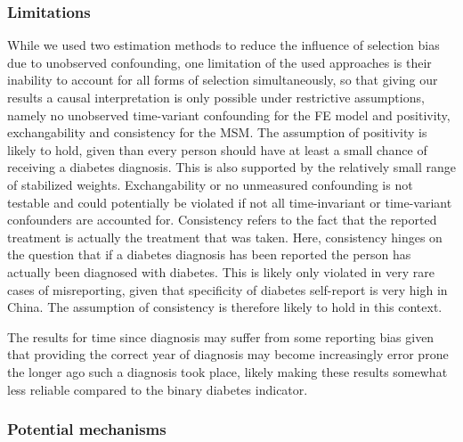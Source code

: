 \subsubsection*{Limitations}

While we used two estimation methods to reduce the influence of selection bias due to unobserved confounding, one limitation of the used approaches is their inability to account for all forms of selection simultaneously, so that giving our results a causal interpretation is only possible under restrictive assumptions, namely no unobserved time-variant confounding for the \ac{FE} model and positivity, exchangability and consistency for the \ac{MSM}. The assumption of positivity is likely to hold, given than every person should have at least a small chance of receiving a diabetes diagnosis. This is also supported by the relatively small range of stabilized weights. Exchangability or no unmeasured confounding is not testable and could potentially be violated if not all time-invariant or time-variant confounders are accounted for. Consistency refers to the fact that the reported treatment is actually the treatment that was taken. Here, consistency hinges on the question that if a diabetes diagnosis has been reported the person has actually been diagnosed with diabetes. This is likely only violated in very rare cases of misreporting, given that specificity of diabetes self-report is very high in China.\autocite{Yuan2015} The assumption of consistency is therefore likely to hold in this context. 

The results for time since diagnosis may suffer from some reporting bias given that providing the correct year of diagnosis may become increasingly error prone the longer ago such a diagnosis took place, likely making these results somewhat less reliable compared to the binary diabetes indicator. 


\subsubsection*{Potential mechanisms}

